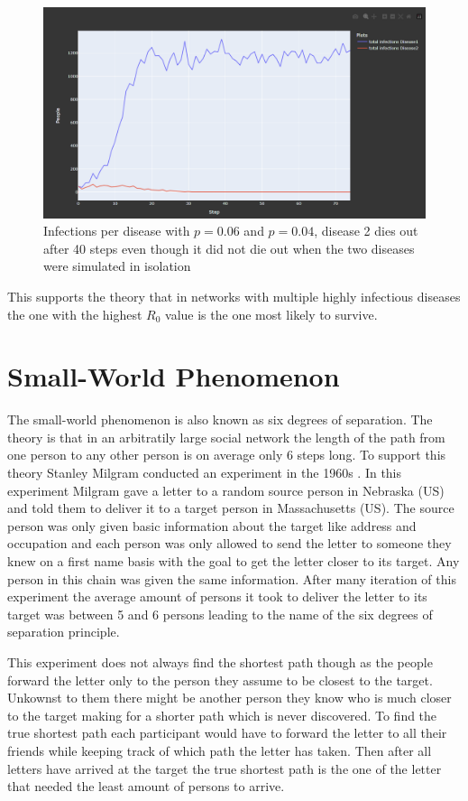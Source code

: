 \begin{figure}
    \centering
    \includegraphics[width=0.5\linewidth]{images/exp_multiple_diseases_both.png}
    \caption{Infections per disease with $p = 0.06$ and $p = 0.04$, disease 2 dies out after 40 steps even though it did not die out when the two diseases were simulated in isolation}
    \label{fig:exp_multiple_diseases}
\end{figure}

This supports the theory that in networks with multiple highly infectious diseases the
one with the highest $R_0$ value is the one most likely to survive.

\section{Small-World Phenomenon}
The small-world phenomenon is also known as six degrees of separation. The theory is that
in an arbitratily large social network the length of the path from one person to any other
person is on average only 6 steps long. To support this theory Stanley Milgram conducted
an experiment in the 1960s \cite{smallWorld}. In this experiment Milgram gave a letter to 
a random source person in Nebraska (US) and told them to deliver it to a target person in
Massachusetts (US). The source person was only given basic information about the target like 
address and occupation and each person was only allowed to send the letter to someone they
knew on a first name basis with the goal to get the letter closer to its target. Any person
in this chain was given the same information. After many iteration of this experiment the 
average amount of persons it took to deliver the letter to its target was between 5 and 6 persons
leading to the name of the six degrees of separation principle.

This experiment does not always find the shortest path though as the people forward the letter
only to the person they assume to be closest to the target. Unkownst to them there might
be another person they know who is much closer to the target making for a shorter path which
is never discovered. To find the true shortest path each participant would have to forward
the letter to all their friends while keeping track of which path the letter has taken.
Then after all letters have arrived at the target the true shortest path is the one of the
letter that needed the least amount of persons to arrive.

